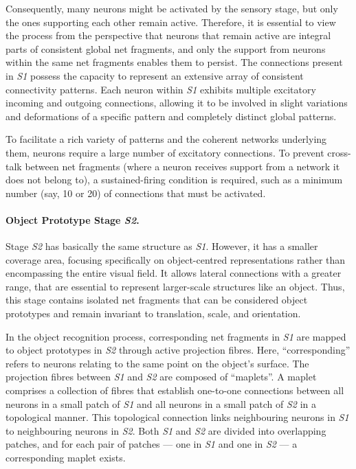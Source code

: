 Consequently, many neurons might be activated by the sensory stage, but only the ones supporting each other remain active.
Therefore, it is essential to view the process from the perspective that neurons that remain active are integral parts of consistent global net fragments, and only the support from neurons within the same net fragments enables them to persist.
The connections present in \emph{S1} possess the capacity to represent an extensive array of consistent connectivity patterns. Each neuron within \emph{S1} exhibits multiple excitatory incoming and outgoing connections, allowing it to be involved in slight variations and deformations of a specific pattern and completely distinct global patterns. 

To facilitate a rich variety of patterns and the coherent networks underlying them, neurons require a large number of excitatory connections. To prevent cross-talk between net fragments (where a neuron receives support from a network it does not belong to), a sustained-firing condition is required, such as a minimum number (say, 10 or 20) of connections that must be activated.

\paragraph{Object Prototype Stage \emph{S2}.} Stage \emph{S2} has basically the same structure as \emph{S1}. However, it has a smaller coverage area, focusing specifically on object-centred representations rather than encompassing the entire visual field. It allows lateral connections with a greater range, that are essential to represent larger-scale structures like an object. 
Thus, this stage contains isolated net fragments that can be considered object prototypes and remain invariant to translation, scale, and orientation.

In the object recognition process, corresponding net fragments in \emph{S1} are mapped to object prototypes in \emph{S2} through active projection fibres. Here, ``corresponding'' refers to neurons relating to the same point on the object's surface.
The projection fibres between \emph{S1} and \emph{S2} are composed of ``maplets''. A maplet comprises a collection of fibres that establish one-to-one connections between all neurons in a small patch of \emph{S1} and all neurons in a small patch of \emph{S2} in a topological manner. This topological connection links neighbouring neurons in \emph{S1} to neighbouring neurons in \emph{S2}. Both \emph{S1} and \emph{S2} are divided into overlapping patches, and for each pair of patches — one in \emph{S1} and one in \emph{S2} — a corresponding maplet exists.


